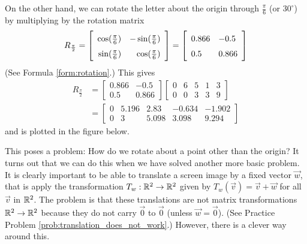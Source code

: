 \documentclass{ximera}
\begin{document}
On the other hand, we can rotate the letter about the origin through $\frac{\pi}{6}$ (or $30^\circ$) by multiplying by the rotation matrix  $$R_{\frac{\pi}{2}} = \left[
\def\arraystretch{1.5}\begin{array}{rr}
\cos(\frac{\pi}{6}) & -\sin(\frac{\pi}{6})\\
\sin(\frac{\pi}{6}) & \cos(\frac{\pi}{6})
\end{array}
\right] = \left[
\begin{array}{ll}
0.866 & -0.5\\
0.5 & 0.866
\end{array}
\right]$$
(See Formula \ref{form:rotation}.)  This gives
\begin{align*}
R_{\frac{\pi}{2}} &= \left[
\begin{array}{ll}
0.866 & -0.5\\
0.5 & 0.866
\end{array}
\right] \left[
\begin{array}{rrrrr}
0 & 6 & 5 & 1 & 3\\
0 & 0 & 3 & 3 & 9
\end{array}
\right] \\ &=
\left[
\begin{array}{lllrr}
0 & 5.196 & 2.83 & -0.634 & -1.902\\
0 & 3 & 5.098 & 3.098 & 9.294
\end{array}
\right]
\end{align*}
and is plotted in the figure below.
    
    \begin{center}
\end{center} 
    
This poses a problem: How do we rotate
about a point other than the origin? It turns out that we can do this when
we have solved another more basic problem. It is clearly important to be
    able to translate a screen image by a fixed vector $\vec{w}$, that is apply the transformation $T_{w} : \mathbb{R}^2 \to \mathbb{R}^2$ given by $T_{w}(\vec{v}) = \vec{v} + \vec{w}$ for all $\vec{v}$ in $\mathbb{R}^2$. The problem is that these translations are not matrix transformations $\mathbb{R}^2 \to \mathbb{R}^2$ because they do not carry $\vec{0}$ to $\vec{0}$ (unless $\vec{w} = \vec{0}$). (See Practice Problem \ref{prob:translation_does_not_work}.) However, there is a clever way around this.
    
\end{document}
